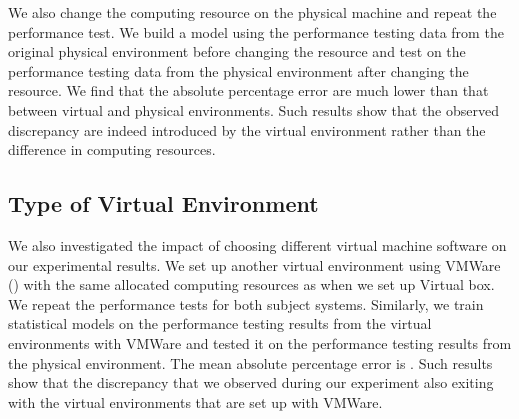 We also change the computing resource on the physical machine and repeat the performance test. We build a model using the performance testing data from the original physical environment before changing the resource and test on the performance testing data from the physical environment after changing the resource. We find that the absolute percentage error are much lower than that between virtual and physical environments. Such results show that the observed discrepancy are indeed introduced by the virtual environment rather than the difference in computing resources.




\subsection{Type of Virtual Environment}

We also investigated the impact of choosing different virtual machine software on our experimental results. We set up another virtual environment using VMWare () with the same allocated computing resources as when we set up Virtual box. We repeat the performance tests for both subject systems. Similarly, we train statistical models on the performance testing results from the virtual environments with VMWare and tested it on the performance testing results from the physical environment. The mean absolute percentage error is . Such results show that the discrepancy that we observed during our experiment also exiting with the virtual environments that are set up with VMWare.


